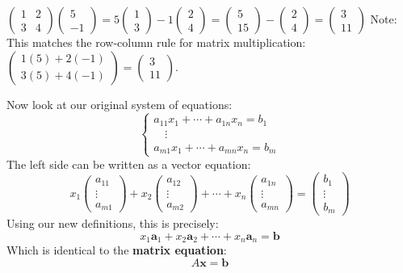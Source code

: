 \documentclass[oneside]{book}
\begin{document}
\begin{example}
$\begin{pmatrix} 1 & 2 \\ 3 & 4 \end{pmatrix} \begin{pmatrix} 5 \\ -1 \end{pmatrix}
= 5 \begin{pmatrix} 1 \\ 3 \end{pmatrix} - 1 \begin{pmatrix} 2 \\ 4 \end{pmatrix}
= \begin{pmatrix} 5 \\ 15 \end{pmatrix} - \begin{pmatrix} 2 \\ 4 \end{pmatrix}
= \begin{pmatrix} 3 \\ 11 \end{pmatrix}$
Note: This matches the row-column rule for matrix multiplication:
$\begin{pmatrix} 1(5) + 2(-1) \\ 3(5) + 4(-1) \end{pmatrix} = \begin{pmatrix} 3 \\ 11 \end{pmatrix}$.
\end{example}

Now look at our original system of equations:
\[
\begin{cases}
a_{11}x_1 + \cdots + a_{1n}x_n = b_1\\
\quad \vdots \\
a_{m1}x_1 + \cdots + a_{mn}x_n = b_m
\end{cases}
\]
The left side can be written as a vector equation:
\[
x_1 \begin{pmatrix} a_{11} \\ \vdots \\ a_{m1} \end{pmatrix} +
x_2 \begin{pmatrix} a_{12} \\ \vdots \\ a_{m2} \end{pmatrix} + \cdots +
x_n \begin{pmatrix} a_{1n} \\ \vdots \\ a_{mn} \end{pmatrix}
=
\begin{pmatrix} b_1 \\ \vdots \\ b_m
\end{pmatrix}
\]
Using our new definitions, this is precisely:
\[ x_1\mathbf{a}_1 + x_2\mathbf{a}_2 + \cdots + x_n\mathbf{a}_n = \mathbf{b} \]
Which is identical to the \textbf{matrix equation}:
\[ A\mathbf{x} = \mathbf{b} \]
\end{document}
